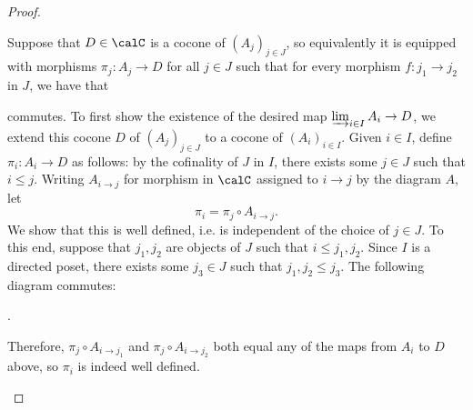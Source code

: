 \begin{proof}
\begin{enumerate}
        Suppose that $D \in \calC$ is a cocone of $(A_j)_{j \in J}$, so equivalently it is equipped with morphisms $\pi_j: A_j \to D$ for all $j \in J$ such that for every morphism $f: j_1 \to j_2$ in $J$, we have that 
        \begin{center}
        \end{center}
        commutes. 
        To first show the existence of the desired map $\varinjlim_{i \in I} A_i \to D$, we extend this cocone $D$ of $(A_j)_{j \in J}$ to a cocone of $(A_i)_{i \in I}$. Given $i \in I$, define $\pi_i: A_i \to D$ as follows: by the cofinality of $J$ in $I$, there exists some $j \in J$ such that $i \leq j$. Writing $A_{i \to j}$ for morphism in $\calC$ assigned to $i \to j$ by the diagram $A$, let 
        \begin{equation} \label{eq:consturction_of_extension_of_cocone_on_cofinal_subposet_to_directed_parent_poset}
        \pi_i = \pi_j \circ A_{i \to j}.
        \end{equation}
        We show that this is well defined, i.e. is independent of the choice of $j \in J$. To this end, suppose that $j_1,j_2$ are objects of $J$ such that $i \leq j_1,j_2$. Since $I$ is a directed poset, there exists some $j_3 \in J$ such that $j_1,j_2 \leq j_3$. The following diagram commutes: 
        \begin{center}
            .
        \end{center}
        Therefore, $\pi_j \circ A_{i \to j_1}$ and $\pi_j \circ A_{i \to j_2}$ both equal any of the maps from $A_i$ to $D$ above, so $\pi_i$ is indeed well defined. 


\end{enumerate}
\end{proof}
